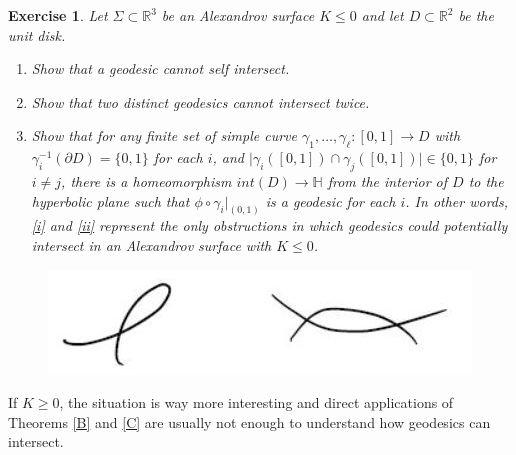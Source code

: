 \documentclass[oneside,a4paper]{amsart}
\newtheorem{exer}[thm]{Exercise}
\begin{document}
\begin{exer}
Let $\Sigma\subset \mathbb{R}^3$ be an Alexandrov surface $K \leq 0$ and let $D\subset \mathbb{R}^2$ be the unit disk.
\begin{enumerate}
\item \label{i} Show that a geodesic cannot self intersect.
\item \label{ii} Show that two distinct geodesics cannot intersect twice.
\item Show that for any finite set of simple curve $\gamma_1 , \ldots , \gamma _{\ell} : [0,1] \to D$ with $\gamma_i^{-1}(\partial D) = \{ 0,1 \}$ for each $i$, and $\vert \gamma_i ([0,1]) \cap \gamma_j ([0,1]) \vert \in \{ 0,1 \}$ for $i \neq j$, there is a homeomorphism $int (D) \to \mathbb{H}$ from the interior of $D$ to the hyperbolic plane such that $\phi \circ \gamma_i \vert_{(0,1)}$ is a geodesic for each $i$. In other words, \ref{i} and \ref{ii} represent the only obstructions in which geodesics could potentially intersect in an Alexandrov surface with $K \leq 0$.
\end{enumerate}
\end{exer}


\begin{figure}[h]
\begin{center}
\includegraphics[scale=0.9]{P4.jpg}\\
\end{center}
\end{figure}

If $K \geq 0$, the situation is way more interesting and direct applications of Theorems \ref{B} and \ref{C} are usually not enough to understand how geodesics can intersect.
\end{document}
